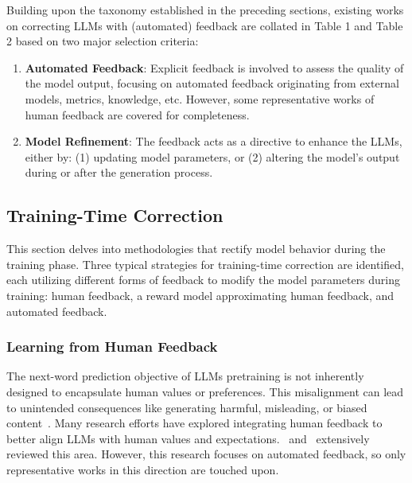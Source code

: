 \documentclass[12pt]{extarticle}
\begin{document}
Building upon the taxonomy established in the preceding sections, existing works on correcting LLMs with (automated) feedback are collated in Table 1 and Table 2 based on two major selection criteria:

\begin{enumerate}
    \item \textbf{Automated Feedback}: Explicit feedback is involved to assess the quality of the model output, focusing on automated feedback originating from external models, metrics, knowledge, etc. However, some representative works of human feedback are covered for completeness.

    \item \textbf{Model Refinement}: The feedback acts as a directive to enhance the LLMs, either by: (1) updating model parameters, or (2) altering the model's output during or after the generation process.
\end{enumerate}

\subsection{Training-Time Correction}
This section delves into methodologies that rectify model behavior during the training phase. Three typical strategies for training-time correction are identified, each utilizing different forms of feedback to modify the model parameters during training: human feedback, a reward model approximating human feedback, and automated feedback.

\subsubsection{Learning from Human Feedback}
The next-word prediction objective of LLMs pretraining is not inherently designed to encapsulate human values or preferences. This misalignment can lead to unintended consequences like generating harmful, misleading, or biased content~\cite{kenton2021alignment}. Many research efforts have explored integrating human feedback to better align LLMs with human values and expectations.~\cite{wang2023aligning} and~\cite{fernandes2023bridging} extensively reviewed this area. However, this research focuses on automated feedback, so only representative works in this direction are touched upon.
\end{document}
